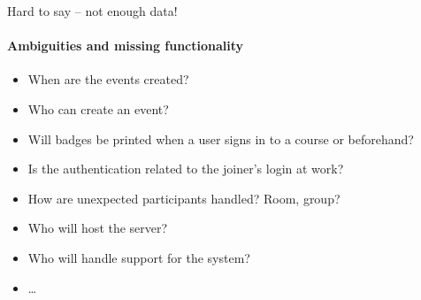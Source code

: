 \documentclass[Main]{subfiles}
\begin{document}
Hard to say -- not enough data!



\paragraph{Ambiguities and missing functionality}
\begin{itemize}
\item When are the events created? 

\item Who can create an event?

\item Will badges be printed when a user signs in to a course or beforehand?

\item Is the authentication related to the joiner's login at work?

\item How are unexpected participants handled? Room, group?

\item Who will host the server?

\item Who will handle support for the system?

\item \dots
\end{itemize}
\end{document}

